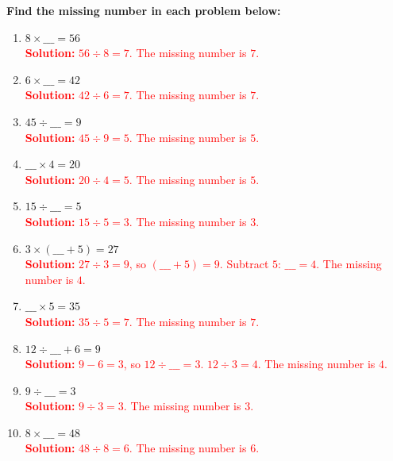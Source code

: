 \documentclass[11pt]{article}
\begin{document}
\begin{tcolorbox}[colframe=black!60, colback=white, 
coltitle=black, colbacktitle=black!15, fonttitle=\bfseries\Large, 
title=Exercises, halign title=center, left=10pt, right=10pt, top=10pt, bottom=60pt]
\textbf{Find the missing number in each problem below:}
\begin{enumerate}[itemsep=2em]
    \item \(8 \times \_\_\_ = 56\)\\
    \textcolor{red}{\textbf{Solution:} \(56 \div 8 = 7\). The missing number is \(7\).}

    \item \(6 \times \_\_\_ = 42\)\\
    \textcolor{red}{\textbf{Solution:} \(42 \div 6 = 7\). The missing number is \(7\).}

    \item \(45 \div \_\_\_ = 9\)\\
    \textcolor{red}{\textbf{Solution:} \(45 \div 9 = 5\). The missing number is \(5\).}

    \item \(\_\_\_ \times 4 = 20\)\\
    \textcolor{red}{\textbf{Solution:} \(20 \div 4 = 5\). The missing number is \(5\).}

    \item \(15 \div \_\_\_ = 5\)\\
    \textcolor{red}{\textbf{Solution:} \(15 \div 5 = 3\). The missing number is \(3\).}

    \item \(3 \times (\_\_\_ + 5) = 27\)\\
    \textcolor{red}{\textbf{Solution:} \(27 \div 3 = 9\), so \((\_\_\_ + 5) = 9\). Subtract \(5\): \(\_\_\_ = 4\). The missing number is \(4\).}

    \item \(\_\_\_ \times 5 = 35\)\\
    \textcolor{red}{\textbf{Solution:} \(35 \div 5 = 7\). The missing number is \(7\).}

    \item \(12 \div \_\_\_ + 6 = 9\)\\
    \textcolor{red}{\textbf{Solution:} \(9 - 6 = 3\), so \(12 \div \_\_\_ = 3\). \(12 \div 3 = 4\). The missing number is \(4\).}

    \item \(9 \div \_\_\_ = 3\)\\
    \textcolor{red}{\textbf{Solution:} \(9 \div 3 = 3\). The missing number is \(3\).}

    \item \(8 \times \_\_\_ = 48\)\\
    \textcolor{red}{\textbf{Solution:} \(48 \div 8 = 6\). The missing number is \(6\).}
\end{enumerate}
\end{tcolorbox}
\end{document}

